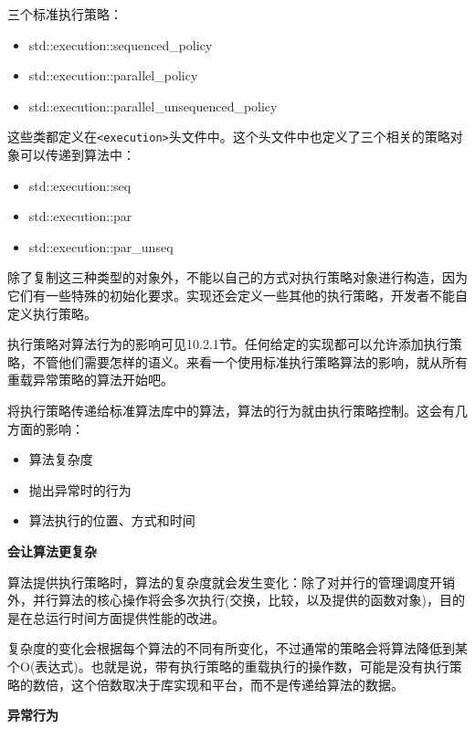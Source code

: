 
三个标准执行策略：

\begin{itemize}
    \item std::execution::sequenced\_policy
    \item std::execution::parallel\_policy
    \item std::execution::parallel\_unsequenced\_policy
\end{itemize}

这些类都定义在\texttt{<execution>}头文件中。这个头文件中也定义了三个相关的策略对象可以传递到算法中：

\begin{itemize}
    \item std::execution::seq
    \item std::execution::par
    \item std::execution::par\_unseq
\end{itemize}

除了复制这三种类型的对象外，不能以自己的方式对执行策略对象进行构造，因为它们有一些特殊的初始化要求。实现还会定义一些其他的执行策略，开发者不能自定义执行策略。

执行策略对算法行为的影响可见10.2.1节。任何给定的实现都可以允许添加执行策略，不管他们需要怎样的语义。来看一个使用标准执行策略算法的影响，就从所有重载异常策略的算法开始吧。


将执行策略传递给标准算法库中的算法，算法的行为就由执行策略控制。这会有几方面的影响：

\begin{itemize}
    \item 算法复杂度
    \item 抛出异常时的行为
    \item 算法执行的位置、方式和时间
\end{itemize}

\textbf{会让算法更复杂}

算法提供执行策略时，算法的复杂度就会发生变化：除了对并行的管理调度开销外，并行算法的核心操作将会多次执行(交换，比较，以及提供的函数对象)，目的是在总运行时间方面提供性能的改进。

复杂度的变化会根据每个算法的不同有所变化，不过通常的策略会将算法降低到某个O(表达式)。也就是说，带有执行策略的重载执行的操作数，可能是没有执行策略的数倍，这个倍数取决于库实现和平台，而不是传递给算法的数据。

\textbf{异常行为}

